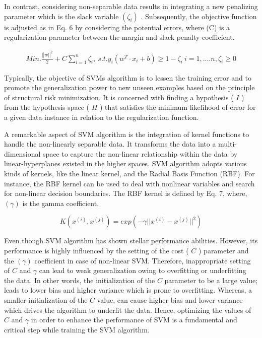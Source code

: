 \documentclass{article}
\begin{document}
In contrast, considering non-separable data results in integrating a new penalizing parameter which is the slack variable $(\zeta_{i})$ . Subsequently, the objective function is adjusted as in Eq. 6 by considering the potential errors, where (C) is a regularization parameter between the margin and slack penalty coefficient.


\begin{equation}
\begin{array}{c}{{M i n.\frac{\lvert|w\rvert|^{2}}{2}+C\displaystyle\sum_{i=1}^{n}\zeta_{i},}}\ {{s.t.y_{i}(w^{T}\cdot x_{i}+b)\geq1-\zeta_{i}}}\ {{i=1,....n,\zeta_{i}\geq0}}\end{array}
\end{equation}


Typically, the objective of SVMs algorithm is to lessen the training error and to promote the generalization power to new unseen examples based on the principle of structural risk minimization. It is concerned with finding a hypothesis ( $I$ ) from the hypothesis space ( $H$ ) that satisfies the minimum likelihood of error for a given data instance in relation to the regularization function.


A remarkable aspect of SVM algorithm is the integration of kernel functions to handle the non-linearly separable data. It transforms the data into a multi-dimensional space to capture the non-linear relationship within the data by linear-hyperplanes existed in the higher spaces. SVM algorithm adopts various kinds of kernels, like the linear kernel, and the Radial Basis Function (RBF). For instance, the RBF kernel can be used to deal with nonlinear variables and search for non-linear decision boundaries. The RBF kernel is defined by Eq. 7, where, $(\gamma)$ is the gamma coefficient.


\begin{equation}
K(x^{(i)},x^{(j)})=e x p(-\gamma||x^{(i)}-x^{(j)}||^{2})
\end{equation}


Even though SVM algorithm has shown stellar performance abilities. However, its performance is highly influenced by the setting of the cost ( $C$ ) parameter and the $(\gamma)$ coefficient in case of non-linear SVM. Therefore, inappropriate setting of $C$ and $\gamma$ can lead to weak generalization owing to overfitting or underfitting the data. In other words, the initialization of the $C$ parameter to be a large value; leads to lower bias and higher variance which is prone to overfitting. Whereas, a smaller initialization of the $C$ value, can cause higher bias and lower variance which drives the algorithm to underfit the data. Hence, optimizing the values of $C$ and $\gamma$ in order to enhance the performance of SVM is a fundamental and critical step while training the SVM algorithm.
\end{document}
